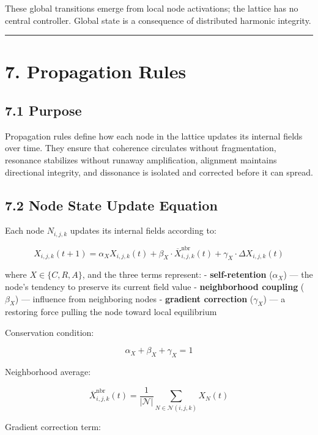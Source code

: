These global transitions emerge from local node activations; the lattice has no central controller. Global state is a consequence of distributed harmonic integrity.

\begin{center}\rule{0.5\linewidth}{0.5pt}\end{center}

\section{7. Propagation Rules}\label{propagation-rules}

\subsection{7.1 Purpose}\label{purpose}

Propagation rules define how each node in the lattice updates its internal fields over time. They ensure that coherence circulates without fragmentation, resonance stabilizes without runaway amplification, alignment maintains directional integrity, and dissonance is isolated and corrected before it can spread.

\subsection{7.2 Node State Update Equation}\label{node-state-update-equation}

Each node \(N_{i,j,k}\) updates its internal fields according to:

\[
X_{i,j,k}(t+1) = \alpha_X X_{i,j,k}(t) + \beta_X \cdot \overline{X}^{\text{nbr}}_{i,j,k}(t)
+ \gamma_X \cdot \Delta X_{i,j,k}(t)
\]

where \(X \in \{C, R, A\}\), and the three terms represent: - \textbf{self-retention} (\(\alpha_X\)) --- the node's tendency to preserve its current field value - \textbf{neighborhood coupling} (\(\beta_X\)) --- influence from neighboring nodes - \textbf{gradient correction} (\(\gamma_X\)) --- a restoring force pulling the node toward local equilibrium

Conservation condition:

\[
\alpha_X + \beta_X + \gamma_X = 1
\]

Neighborhood average:

\[
\overline{X}^{\text{nbr}}_{i,j,k}(t) = \frac{1}{|\mathcal{N}|}
\sum_{N \in \mathcal{N}(i,j,k)} X_N(t)
\]

Gradient correction term:


